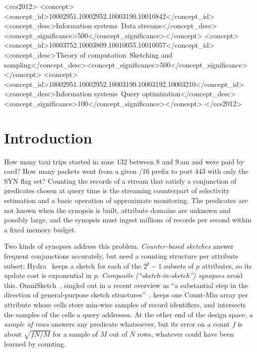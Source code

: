 \documentclass[sigconf]{acmart}
\newcommand{\omni}{OmniSketch\xspace}
\begin{document}
\begin{CCSXML}
<ccs2012>
<concept><concept_id>10002951.10002952.10003190.10010842</concept_id>
<concept_desc>Information systems~Data streams</concept_desc><concept_significance>500</concept_significance></concept>
<concept><concept_id>10003752.10003809.10010055.10010057</concept_id>
<concept_desc>Theory of computation~Sketching and sampling</concept_desc><concept_significance>500</concept_significance></concept>
<concept><concept_id>10002951.10002952.10003190.10003192.10003210</concept_id>
<concept_desc>Information systems~Query optimization</concept_desc><concept_significance>100</concept_significance></concept>
</ccs2012>
\end{CCSXML}


\maketitle

\section{Introduction}\label{sec:intro}

How many taxi trips started in zone 132 between 8 and 9\,am and were paid by card? How many packets went
from a given /16 prefix to port 443 with only the SYN flag set? Counting the records of a stream that
satisfy a conjunction of predicates chosen at query time is the streaming counterpart of selectivity
estimation and a basic operation of approximate monitoring. The predicates are not known when the
synopsis is built, attribute domains are unknown and possibly large, and the synopsis must ingest
millions of records per second within a fixed memory budget.

Two kinds of synopses address this problem. \emph{Counter-based sketches} answer frequent conjunctions
accurately, but need a counting structure per attribute subset: Hydra~\cite{hydra} keeps a sketch for each
of the $2^p-1$ subsets of $p$ attributes, so its update cost is exponential in $p$. \emph{Composite
(``sketch-in-sketch'') synopses} avoid this. \omni~\cite{omni,omni-sr,omni-vldbj}, singled out in a recent
overview as ``a substantial step in the direction of general-purpose sketch structures''~\cite{birdseye},
keeps one Count-Min array per attribute whose cells store min-wise samples of record identifiers, and
intersects the samples of the cells a query addresses. At the other end of the design space, a
\emph{sample of rows} answers any predicate whatsoever, but its error on a count $f$ is about
$\sqrt{fN/M}$ for a sample of $M$ out of $N$ rows, whatever could have been learned by counting.
\end{document}
